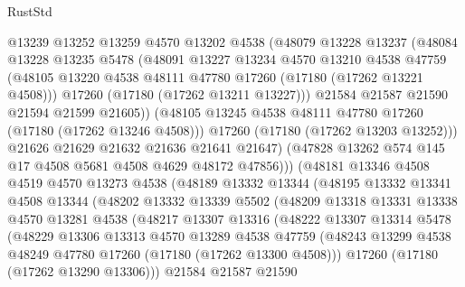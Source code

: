 \begin{lexlean}{RustStd}
\begin{coremodule}
{\begin{coremodule}
{{{{{{{{{{{{{{{{{{{{{{{{{{{{{{{{{{{{{{{{{{{{{{{{{{{{{{{                  @13239
                  @13252
                  @13259
                  @4570
                  @13202
                  @4538
                  (@48079
                    @13228
                    @13237
                    (@48084
                      @13228
                      @13235
                      @5478
                      (@48091
                        @13227
                        @13234
                        @4570
                        @13210
                        @4538
                        @47759
                        (@48105 @13220 @4538 @48111 @47780 @17260 (@17180 (@17262 @13221 @4508)))
                        @17260
                        (@17180 (@17262 @13211 @13227)))
                      @21584
                      @21587
                      @21590
                      @21594
                      @21599
                      @21605))
                  (@48105 @13245 @4538 @48111 @47780 @17260 (@17180 (@17262 @13246 @4508)))
                  @17260
                  (@17180 (@17262 @13203 @13252)))
                @21626
                @21629
                @21632
                @21636
                @21641
                @21647)
              (@47828 @13262 @574 @145 @17 @4508 @5681 @4508 @4629 @48172 @47856)))
          (@48181
            @13346
            @4508
            @4519
            @4570
            @13273
            @4538
            (@48189
              @13332
              @13344
              (@48195
                @13332
                @13341
                @4508
                @13344
                (@48202
                  @13332
                  @13339
                  @5502
                  (@48209
                    @13318
                    @13331
                    @13338
                    @4570
                    @13281
                    @4538
                    (@48217
                      @13307
                      @13316
                      (@48222
                        @13307
                        @13314
                        @5478
                        (@48229
                          @13306
                          @13313
                          @4570
                          @13289
                          @4538
                          @47759
                          (@48243 @13299 @4538 @48249 @47780 @17260 (@17180 (@17262 @13300 @4508)))
                          @17260
                          (@17180 (@17262 @13290 @13306)))
                        @21584
                        @21587
                        @21590
}}}}}}}}}}}}}}}}}}}}}}}}}}}}}}}}}}}}}}}}}}}}}}}}}}}}}}}
\end{coremodule}}
\end{coremodule}
\end{lexlean}

